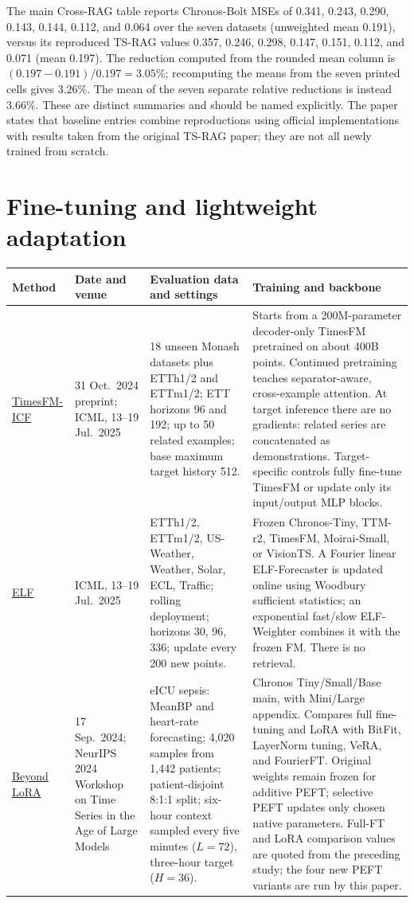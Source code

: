 \documentclass[10pt]{article}
\begin{document}
The main Cross-RAG table reports Chronos-Bolt MSEs of 0.341, 0.243, 0.290,
0.143, 0.144, 0.112, and 0.064 over the seven datasets (unweighted mean
0.191), versus its reproduced TS-RAG values 0.357, 0.246, 0.298, 0.147,
0.151, 0.112, and 0.071 (mean 0.197). The reduction computed from the rounded
mean column is $(0.197-0.191)/0.197=3.05\%$; recomputing the means from the
seven printed cells gives $3.26\%$. The mean of the seven separate relative
reductions is instead $3.66\%$. These are distinct summaries and should be
named explicitly. The paper states that baseline entries combine reproductions
using official implementations with results taken from the original TS-RAG
paper; they are not all newly trained from scratch.

\section{Fine-tuning and lightweight adaptation}
\small
\begin{longtable}{p{.16\linewidth}p{.17\linewidth}p{.27\linewidth}p{.285\linewidth}}
\toprule
Method & Date and venue & Evaluation data and settings & Training and backbone \\
\midrule
\endhead
\href{https://proceedings.mlr.press/v267/faw25b.html}{TimesFM-ICF}
& 31 Oct.\ 2024 preprint; ICML, 13--19 Jul.\ 2025
& 18 unseen Monash datasets plus ETTh1/2 and ETTm1/2; ETT horizons 96 and
192; up to 50 related examples; base maximum target history 512.
& Starts from a 200M-parameter decoder-only TimesFM pretrained on about 400B
points. Continued pretraining teaches separator-aware, cross-example attention.
At target inference there are no gradients: related series are concatenated
as demonstrations. Target-specific controls fully fine-tune TimesFM or update
only its input/output MLP blocks.\\
\addlinespace
\href{https://proceedings.mlr.press/v267/lee25ag.html}{ELF}
& ICML, 13--19 Jul.\ 2025
& ETTh1/2, ETTm1/2, US-Weather, Weather, Solar, ECL, Traffic; rolling
deployment; horizons 30, 96, 336; update every 200 new points.
& Frozen Chronos-Tiny, TTM-r2, TimesFM, Moirai-Small, or VisionTS. A Fourier
linear ELF-Forecaster is updated online using Woodbury sufficient statistics;
an exponential fast/slow ELF-Weighter combines it with the frozen FM. There is
no retrieval.\\
\addlinespace
\href{https://arxiv.org/pdf/2409.11302}{Beyond LoRA}
& 17 Sep.\ 2024; NeurIPS 2024 Workshop on Time Series in the Age of Large Models
& eICU sepsis: MeanBP and heart-rate forecasting; 4,020 samples from 1,442
patients; patient-disjoint 8:1:1 split; six-hour context sampled every five
minutes ($L=72$), three-hour target ($H=36$).
& Chronos Tiny/Small/Base main, with Mini/Large appendix. Compares full
fine-tuning and LoRA with BitFit, LayerNorm tuning, VeRA, and FourierFT.
Original weights remain frozen for additive PEFT; selective PEFT updates only
chosen native parameters. Full-FT and LoRA comparison values are quoted from
the preceding study; the four new PEFT variants are run by this paper.\\
\bottomrule
\end{longtable}
\normalsize
\end{document}

